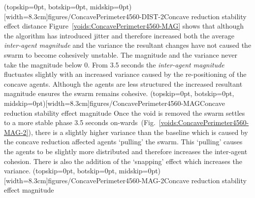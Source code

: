 \documentclass{ieeeaccess}
\begin{document}
\Figure[t!](topskip=0pt, botskip=0pt, midskip=0pt)[width=8.3cm]{figures/ConcavePerimeter4560-DIST-2}{Concave reduction stability effect distance\label{voids:ConcavePerimeter4560-DIST-2}}
Figure~\ref{voids:ConcavePerimeter4560-MAG} shows that although the algorithm has introduced jitter and therefore increased both the average \textit{inter-agent magnitude} and the variance the resultant changes have not caused the swarm to become cohesively unstable. The magnitude and the variance never take the magnitude below 0. From 3.5 seconds the \textit{inter-agent magnitude} fluctuates slightly with an increased variance caused by the re-positioning of the concave agents. Although the agents are less structured the increased resultant magnitude ensures the swarm remains cohesive. 
\Figure[t!](topskip=0pt, botskip=0pt, midskip=0pt)[width=8.3cm]{figures/ConcavePerimeter4560-MAG}{Concave reduction stability effect magnitude\label{voids:ConcavePerimeter4560-MAG}}
Once the void is removed the swarm settles to a more stable phase 3.5 seconds on-wards~(Fig.~\ref{voids:ConcavePerimeter4560-MAG-2}), there is a slightly higher variance than the baseline which is caused by the concave reduction affected agents `pulling' the swarm. This `pulling' causes the agents to be slightly more distributed and therefore increases the inter-agent cohesion. There is also the addition of the `snapping' effect which increases the variance. 
\Figure[t!](topskip=0pt, botskip=0pt, midskip=0pt)[width=8.3cm]{figures/ConcavePerimeter4560-MAG-2}{Concave reduction stability effect magnitude\label{voids:ConcavePerimeter4560-MAG-2}}
\end{document}
